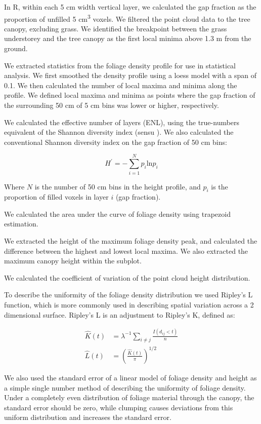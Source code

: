 \documentclass[11pt,a4paper]{article}
\begin{document}
In R, within each 5 cm width vertical layer, we calculated the gap fraction as the proportion of unfilled 5 cm\textsuperscript{3} voxels. We filtered the point cloud data to the tree canopy, excluding grass. We identified the breakpoint between the grass understorey and the tree canopy as the first local minima above 1.3 m from the ground. 

We extracted statistics from the foliage density profile for use in statistical analysis. We first smoothed the density profile using a loess model with a span of 0.1. We then calculated the number of local maxima and minima along the profile. We defined local maxima and minima as points where the gap fraction of the surrounding 50 cm of 5 cm bins was lower or higher, respectively.

We calculated the effective number of layers (ENL), using the true-numbers equivalent of the Shannon diversity index (sensu \citep{Ehbrecht2016}). We also calculated the conventional Shannon diversity index on the gap fraction of 50 cm bins:

\begin{equation}
	H^{\prime{}} = - \sum_{i=1}^{N} p_{i} \text{ln} p_{i}
\end{equation}

Where $N$ is the number of 50 cm bins in the height profile, and $p_{i}$ is the proportion of filled voxels in layer $i$ (gap fraction).

We calculated the area under the curve of foliage density using trapezoid estimation.

We extracted the height of the maximum foliage density peak, and calculated the difference between the highest and lowest local maxima. We also extracted the maximum canopy height within the subplot.

We calculated the coefficient of variation of the point cloud height distribution.

To describe the uniformity of the foliage density distribution we used Ripley's L function, which is more commonly used in describing spatial variation across a 2 dimensional surface. Ripley's L is an adjustment to Ripley's K, defined as:

\begin{align}
	\widehat{K}(t) &= \lambda^{-1} \sum_{i\neq{}j} \frac{I(d_{ij} < t)}{n} \\
	\widehat{L}(t) &= \left(\frac{\widehat{K}(t)}{\pi}\right)^{1/2}
\end{align}

We also used the standard error of a linear model of foliage density and height as a simple single number method of describing the uniformity of foliage density. Under a completely even distribution of foliage material through the canopy, the standard error should be zero, while clumping causes deviations from this uniform distribution and increases the standard error.
\end{document}

